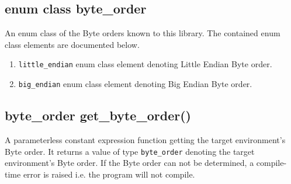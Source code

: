 \documentclass[oneside]{article}
\begin{document}
\subsection{enum class byte\_order}
An enum class of the Byte orders known to this library.
The contained enum class elements are documented below.
\begin{enumerate}
\item \lstinline{little_endian} enum class element denoting Little Endian Byte order.
\item \lstinline{big_endian} enum class element denoting Big Endian Byte order.
\end{enumerate}

\subsection{byte\_order get\_byte\_order()}
A parameterless constant expression function getting the target environment's Byte order. It returns
a value of type \lstinline{byte_order} denoting the target environment's Byte order.     If the Byte
order can not be determined, a compile-time error is raised i.e. the program will not       compile.
\end{document}
